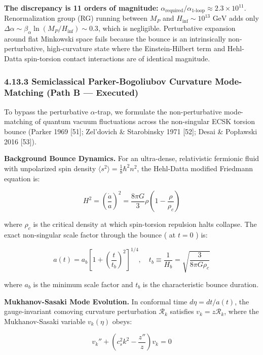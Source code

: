 \documentclass[11pt,a4paper]{article}
\theoremstyle{definition}\newtheorem{definition}{Definition}
\theoremstyle{remark}\newtheorem{remark}{Remark}
\begin{document}
\textbf{The discrepancy is 11 orders of magnitude:} $\alpha_{\text{required}} / \alpha_{\text{1-loop}} \approx 2.3 \times 10^{11}$. Renormalization group (RG) running between $M_P$ and $H_{\text{inf}} \sim 10^{13}\text{ GeV}$ adds only $\Delta\alpha \sim \beta_\alpha \ln(M_P / H_{\text{inf}}) \sim 0.3$, which is negligible. Perturbative expansion around flat Minkowski space fails because the bounce is an intrinsically non-perturbative, high-curvature state where the Einstein-Hilbert term and Hehl-Datta spin-torsion contact interactions are of identical magnitude.
\subsubsection{4.13.3 Semiclassical Parker-Bogoliubov Curvature Mode-Matching (Path B — Executed)}

To bypass the perturbative $\alpha$-trap, we formulate the non-perturbative mode-matching of quantum vacuum fluctuations across the non-singular ECSK torsion bounce (Parker 1969 [51]; Zel'dovich \& Starobinsky 1971 [52]; Desai \& Popławski 2016 [53]).

\textbf{Background Bounce Dynamics.} For an ultra-dense, relativistic fermionic fluid with unpolarized spin density $\langle s^2 \rangle = \frac{1}{8}\hbar^2 n^2$, the Hehl-Datta modified Friedmann equation is:


\begin{equation}
H^2 = \left(\frac{\dot{a}}{a}\right)^2 = \frac{8\pi G}{3}\rho \left(1 - \frac{\rho}{\rho_c}\right)
\end{equation}


where $\rho_c$ is the critical density at which spin-torsion repulsion halts collapse. The exact non-singular scale factor through the bounce ( at $t = 0$ ) is:


\begin{equation}
a(t) = a_b \left[ 1 + \left(\frac{t}{t_b}\right)^2 \right]^{1/4}, \quad t_b \equiv \frac{1}{H_b} = \sqrt{\frac{3}{8\pi G \rho_c}}
\end{equation}


where $a_b$ is the minimum scale factor and $t_b$ is the characteristic bounce duration.

\textbf{Mukhanov-Sasaki Mode Evolution.} In conformal time $d\eta = dt / a(t)$, the gauge-invariant comoving curvature perturbation $\mathcal{R}_k$ satisfies $v_k = z \mathcal{R}_k$, where the Mukhanov-Sasaki variable $v_k(\eta)$ obeys:


\begin{equation}
v_k'' + \left( c_s^2 k^2 - \frac{z''}{z} \right) v_k = 0
\end{equation}
\end{document}
